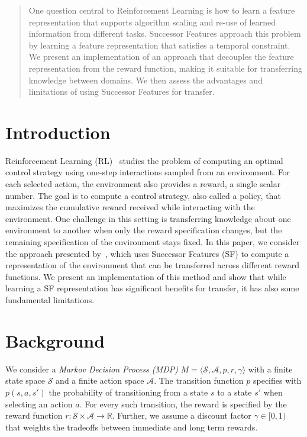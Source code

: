 \documentclass{article}
\begin{document}
\begin{abstract}
One question central to Reinforcement Learning is how to learn a feature representation that supports algorithm scaling and re-use of learned information from different tasks.
Successor Features approach this problem by learning a feature representation that satisfies a temporal constraint.
We present an implementation of an approach that decouples the feature representation from the reward function, making it suitable for transferring knowledge between domains. We then assess the advantages and limitations of using Successor Features for transfer. 
\end{abstract}

\section{Introduction}

Reinforcement Learning (RL)~\cite{kaelbling1996reinforcement,Sutton98} studies the problem of computing an optimal control strategy using one-step interactions sampled from an environment.
For each selected action, the environment also provides a reward, a single scalar number.
The goal is to compute a control strategy, also called a policy, that maximizes the cumulative reward received while interacting with the environment.
One challenge in this setting is transferring knowledge about one environment to another when only the reward specification changes, but the remaining specification of the environment stays fixed.
In this paper, we consider the approach presented by~\citet{barreto2016successor}, which uses Successor Features (SF) to compute a representation of the environment that can be transferred across different reward functions.
We present an implementation of this method and show that while learning a SF representation has significant benefits for transfer, it has also some fundamental limitations.

\section{Background}

We consider a \emph{Markov Decision Process (MDP)} $M = \langle \mathcal{S}, \mathcal{A}, p, r, \gamma \rangle$ with a finite state space $\mathcal{S}$ and a finite action space $\mathcal{A}$. 
The transition function $p$ specifies with $p(s,a,s')$ the probability of transitioning from a state $s$ to a state $s'$ when selecting an action $a$.
For every such transition, the reward is specified by the reward function $r: \mathcal{S} \times \mathcal{A} \to \mathbb{R}$.
Further, we assume a discount factor $\gamma \in [0,1)$ that weights the tradeoffs between immediate and long term rewards.
\end{document}
